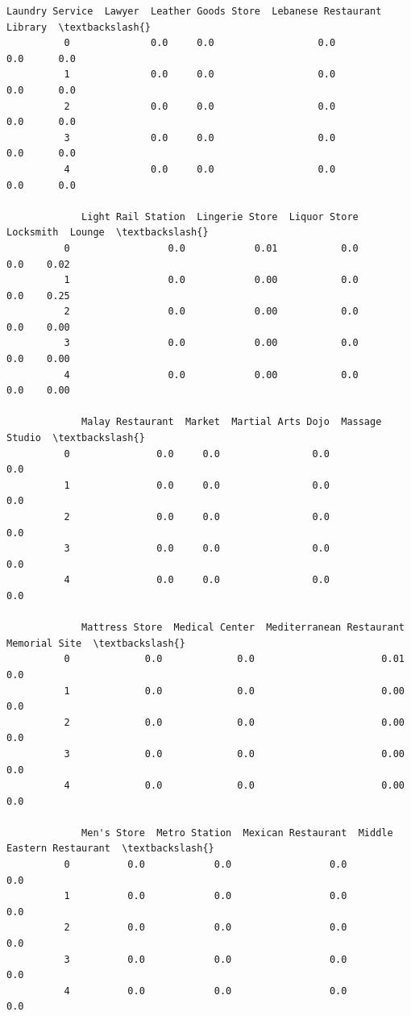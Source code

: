 \documentclass[11pt]{article}
\begin{document}
\begin{Verbatim}[commandchars=\\\{\}]
             Laundry Service  Lawyer  Leather Goods Store  Lebanese Restaurant  Library  \textbackslash{}
          0              0.0     0.0                  0.0                  0.0      0.0   
          1              0.0     0.0                  0.0                  0.0      0.0   
          2              0.0     0.0                  0.0                  0.0      0.0   
          3              0.0     0.0                  0.0                  0.0      0.0   
          4              0.0     0.0                  0.0                  0.0      0.0   
          
             Light Rail Station  Lingerie Store  Liquor Store  Locksmith  Lounge  \textbackslash{}
          0                 0.0            0.01           0.0        0.0    0.02   
          1                 0.0            0.00           0.0        0.0    0.25   
          2                 0.0            0.00           0.0        0.0    0.00   
          3                 0.0            0.00           0.0        0.0    0.00   
          4                 0.0            0.00           0.0        0.0    0.00   
          
             Malay Restaurant  Market  Martial Arts Dojo  Massage Studio  \textbackslash{}
          0               0.0     0.0                0.0             0.0   
          1               0.0     0.0                0.0             0.0   
          2               0.0     0.0                0.0             0.0   
          3               0.0     0.0                0.0             0.0   
          4               0.0     0.0                0.0             0.0   
          
             Mattress Store  Medical Center  Mediterranean Restaurant  Memorial Site  \textbackslash{}
          0             0.0             0.0                      0.01            0.0   
          1             0.0             0.0                      0.00            0.0   
          2             0.0             0.0                      0.00            0.0   
          3             0.0             0.0                      0.00            0.0   
          4             0.0             0.0                      0.00            0.0   
          
             Men's Store  Metro Station  Mexican Restaurant  Middle Eastern Restaurant  \textbackslash{}
          0          0.0            0.0                 0.0                        0.0   
          1          0.0            0.0                 0.0                        0.0   
          2          0.0            0.0                 0.0                        0.0   
          3          0.0            0.0                 0.0                        0.0   
          4          0.0            0.0                 0.0                        0.0   
          

\end{Verbatim}
\end{document}
